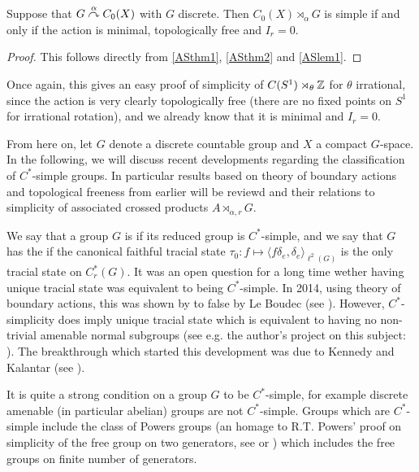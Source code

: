 \begin{corollary}
	Suppose that $G \stackrel{\alpha}{\curvearrowright} C_0(X)$ with $G$ discrete. Then $C_0(X) \rtimes_\alpha G$ is simple if and only if the action is minimal, topologically free and $I_r = 0$.
\end{corollary}
\begin{proof}
	This follows directly from \cref{ASthm1}, \cref{ASthm2} and \cref{ASlem1}.
\end{proof}
Once again, this gives an easy proof of simplicity of $C(S^1) \rtimes_{\theta} \mathbb{Z}$ for $\theta$ irrational, since the action is very clearly topologically free (there are no fixed points on $S^1$ for irrational rotation), and we already know that it is minimal and $I_r = 0$.

From here on, let $G$ denote a discrete countable group and $X$ a compact $G$-space. In the following, we will discuss recent developments regarding the classification of $C^*$-simple groups. In particular results based on theory of boundary actions and topological freeness from earlier will be reviewd and their relations to simplicity of associated crossed products $A \rtimes_{\alpha,r} G$. 

We say that a group $G$ is  if its reduced group is $C^*$-simple, and we say that $G$ has the  if the canonical faithful tracial state $\tau_0 \colon f \mapsto \langle f\delta_e  , \delta_e\rangle_{\ell^2(G)}$ is the only tracial state on $C_r^*(G)$. It was an open question for a long time wether having unique tracial state was equivalent to being $C^*$-simple. In 2014, using theory of boundary actions, this was shown by to false by Le Boudec (see \cite[Thoerem A]{le2017c}). However, $C^*$-simplicity does imply unique tracial state which is equivalent to having no non-trivial amenable normal subgroups (see e.g. the author's project on this subject: \cite[Chapter 5]{bscp}). The breakthrough which started this development was due to Kennedy and Kalantar (see \cite{kalantar2017boundaries}).

It is quite a strong condition on a group $G$ to be $C^*$-simple, for example discrete amenable (in particular abelian) groups are not $C^*$-simple. Groups which are $C^*$-simple include the class of Powers groups (an homage to R.T. Powers' proof on simplicity of the free group on two generators, see \cite{powers1975simplicity} or \cite[chapter 3]{bscp}) which includes the free groups on finite number of generators.

